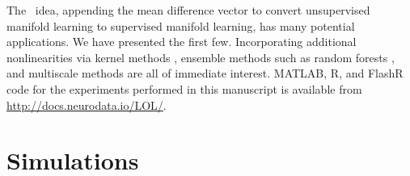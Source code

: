 \documentclass[10pt]{article}
\begin{document}




% 
The \Lol~idea, appending the mean difference vector to convert unsupervised manifold learning to supervised manifold learning, has many potential applications.  We have presented the first few.  Incorporating additional nonlinearities via kernel methods \cite{Mika1999a}, ensemble methods such as random forests \cite{Breiman2001a}, and multiscale methods \cite{Allard2012}
are all of immediate interest. MATLAB, R, and FlashR code for the experiments performed in this manuscript is available from \url{http://docs.neurodata.io/LOL/}.

\clearpage
\appendix

\section{Simulations}
\end{document}
